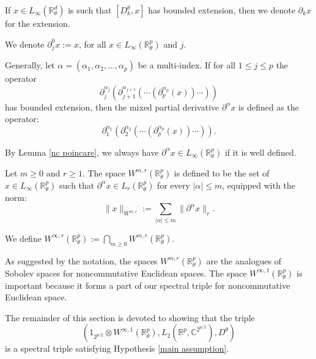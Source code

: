     \begin{defi}
        If $x \in L_\infty(\mathbb{R}^d_\theta)$ is such that $[D_k^\theta,x]$ has bounded extension, then we denote $\partial_kx$ for the extension.
        
        We denote $\partial_j^0x := x$, for all $x \in L_\infty(\mathbb{R}^p_\theta)$ and $j$.
        
        Generally, let $\alpha = (\alpha_1,\alpha_2,\ldots,\alpha_p)$ be a multi-index. If for all $1 \leq j \leq p$ the operator
        \begin{equation*}
            \partial_j^{\alpha_j}(\partial_{j+1}^{\alpha_{j+1}}(\cdots(\partial_p^{\alpha_p}(x))\cdots))
        \end{equation*}
        has bounded extension, then the mixed partial derivative $\partial^{\alpha}x$ is defined as the operator:
        \begin{equation*}
            \partial_1^{\alpha_1}(\partial_2^{\alpha_2}(\cdots(\partial_p^{\alpha_p}(x))\cdots)).
        \end{equation*}
    \end{defi}
    By Lemma \ref{nc poincare}, we always have $\partial^\alpha x \in L_\infty(\mathbb{R}^p_\theta)$ if it is well defined.
    
    \begin{defi}
        Let $m \geq 0$ and $r \geq 1$. The space $W^{m,r}(\mathbb{R}^p_\theta)$ is defined to be the set of $x \in L_\infty(\mathbb{R}^p_\theta)$ such that 
        $\partial^{\alpha}x \in L_r(\mathbb{R}^p_\theta)$ for every $|\alpha| \leq m$, equipped with the norm:
        \begin{equation*}
            \|x\|_{W^{m,r}} := \sum_{|\alpha|\leq m} \|\partial^{\alpha}x\|_r.
        \end{equation*}
        
        We define $W^{\infty,r}(\mathbb{R}^p_\theta) := \bigcap_{m\geq 0} W^{m,r}(\mathbb{R}^p_\theta)$.
    \end{defi}  
    
    As suggested by the notation, the spaces $W^{m,r}(\mathbb{R}^p_\theta)$ are the analogues of Sobolev spaces for noncommutative Euclidean spaces. The space $W^{\infty,1}(\mathbb{R}^p_\theta)$
    is important because it forms a part of our spectral triple for noncommutative Euclidean space.
    
    The remainder of this section is devoted to showing that the triple
    \begin{equation}\label{ncp spectral triple}
        (1_{2^{p/2}}\otimes W^{\infty,1}(\mathbb{R}^p_\theta),L_2(\mathbb{R}^{p},\mathbb{C}^{2^{p/2}}),D^\theta)
    \end{equation}
    is a spectral triple satisfying Hypothesis \ref{main assumption}.
    

